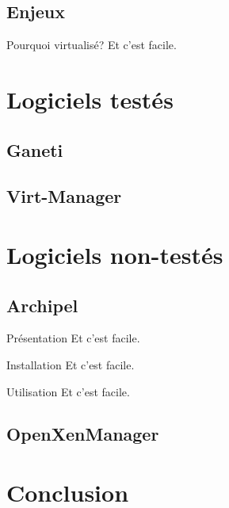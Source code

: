 \documentclass{beamer}
\begin{document}
\subsection{Enjeux}
\begin{frame}{Pourquoi virtualisé?}
  Et c'est facile.
\end{frame}

\section{Logiciels testés}
\subsection{Ganeti}

\subsection{Virt-Manager}

\section{Logiciels non-testés}

\subsection{Archipel}
\begin{frame}{Présentation}
  Et c'est facile.
\end{frame}
\begin{frame}{Installation}
  Et c'est facile.
\end{frame}
\begin{frame}{Utilisation}
  Et c'est facile.
\end{frame}

\subsection{OpenXenManager}



\section{Conclusion}
\end{document}

